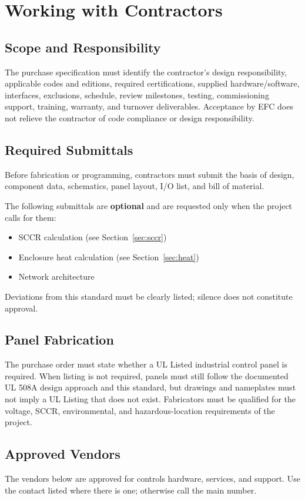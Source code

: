 \chapter{Working with Contractors}
\section{Scope and Responsibility}
The purchase specification must identify the contractor's design responsibility, applicable codes and editions, required certifications, supplied hardware/software, interfaces, exclusions, schedule, review milestones, testing, commissioning support, training, warranty, and turnover deliverables. Acceptance by EFC does not relieve the contractor of code compliance or design responsibility.

\section{Required Submittals}
Before fabrication or programming, contractors must submit the basis of design, component data, schematics, panel layout, I/O list, and bill of material.

The following submittals are \textbf{optional} and are requested only when the project calls for them:
\begin{itemize}[itemsep=1pt]
  \item SCCR calculation (see Section~\ref{sec:sccr})
  \item Enclosure heat calculation (see Section~\ref{sec:heat})
  \item Network architecture
\end{itemize}
Deviations from this standard must be clearly listed; silence does not constitute approval.

\section{Panel Fabrication}
The purchase order must state whether a UL Listed industrial control panel is required. When listing is not required, panels must still follow the documented UL 508A design approach and this standard, but drawings and nameplates must not imply a UL Listing that does not exist. Fabricators must be qualified for the voltage, SCCR, environmental, and hazardous-location requirements of the project.

\section{Approved Vendors}\label{sec:vendors}
The vendors below are approved for controls hardware, services, and support. Use the contact listed where there is one; otherwise call the main number.

